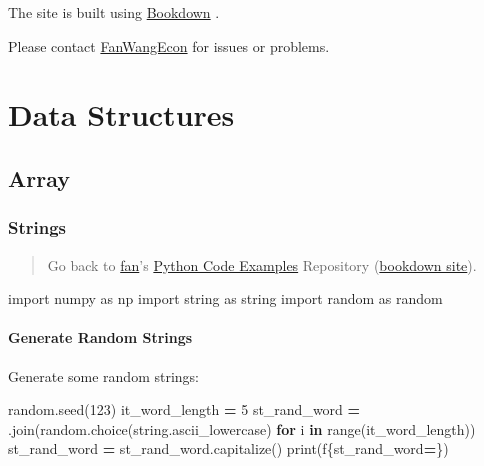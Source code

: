 \documentclass[
]{book}
\newenvironment{Shaded}{\begin{snugshade}}{\end{snugshade}}
\newcommand{\BuiltInTok}[1]{#1}
\newcommand{\ControlFlowTok}[1]{\textcolor[rgb]{0.13,0.29,0.53}{\textbf{#1}}}
\newcommand{\DecValTok}[1]{\textcolor[rgb]{0.00,0.00,0.81}{#1}}
\newcommand{\ImportTok}[1]{#1}
\newcommand{\KeywordTok}[1]{\textcolor[rgb]{0.13,0.29,0.53}{\textbf{#1}}}
\newcommand{\NormalTok}[1]{#1}
\newcommand{\OperatorTok}[1]{\textcolor[rgb]{0.81,0.36,0.00}{\textbf{#1}}}
\newcommand{\SpecialCharTok}[1]{\textcolor[rgb]{0.00,0.00,0.00}{#1}}
\newcommand{\SpecialStringTok}[1]{\textcolor[rgb]{0.31,0.60,0.02}{#1}}
\newcommand{\StringTok}[1]{\textcolor[rgb]{0.31,0.60,0.02}{#1}}
\begin{document}
The site is built using \href{https://bookdown.org/}{Bookdown} \citep{R-bookdown}.

Please contact \href{https://fanwangecon.github.io/}{FanWangEcon} for issues or problems.

\hypertarget{data-structures}{%
\chapter{Data Structures}\label{data-structures}}

\hypertarget{array}{%
\section{Array}\label{array}}

\hypertarget{strings}{%
\subsection{Strings}\label{strings}}

\begin{quote}
Go back to \href{http://fanwangecon.github.io/}{fan}'s \href{https://fanwangecon.github.io/pyfan/}{Python Code Examples} Repository (\href{https://fanwangecon.github.io/pyfan/bookdown}{bookdown site}).
\end{quote}

\begin{Shaded}
\begin{Highlighting}[]
\ImportTok{import}\NormalTok{ numpy }\ImportTok{as}\NormalTok{ np}
\ImportTok{import}\NormalTok{ string }\ImportTok{as}\NormalTok{ string}
\ImportTok{import}\NormalTok{ random }\ImportTok{as}\NormalTok{ random}
\end{Highlighting}
\end{Shaded}

\hypertarget{generate-random-strings}{%
\subsubsection{Generate Random Strings}\label{generate-random-strings}}

Generate some random strings:

\begin{Shaded}
\begin{Highlighting}[]
\NormalTok{random.seed(}\DecValTok{123}\NormalTok{)}
\NormalTok{it\_word\_length }\OperatorTok{=} \DecValTok{5}
\NormalTok{st\_rand\_word }\OperatorTok{=} \StringTok{\textquotesingle{}\textquotesingle{}}\NormalTok{.join(random.choice(string.ascii\_lowercase) }\ControlFlowTok{for}\NormalTok{ i }\KeywordTok{in} \BuiltInTok{range}\NormalTok{(it\_word\_length))}
\NormalTok{st\_rand\_word }\OperatorTok{=}\NormalTok{ st\_rand\_word.capitalize()}
\BuiltInTok{print}\NormalTok{(}\SpecialStringTok{f\textquotesingle{}}\SpecialCharTok{\{}\NormalTok{st\_rand\_word}\OperatorTok{=}\SpecialCharTok{\}}\SpecialStringTok{\textquotesingle{}}\NormalTok{)}
\end{Highlighting}
\end{Shaded}
\end{document}
